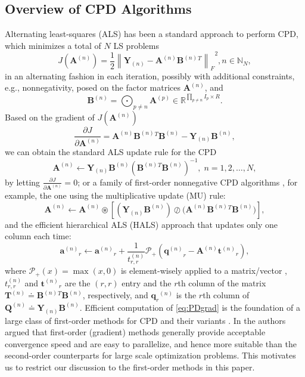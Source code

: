 \documentclass[10pt,twocolumn,twoside]{IEEEtran}
\newcommand{\mats}[2][n]{\ensuremath{\mathbf{#2}_{#1}}}
\newcommand{\tenmat}[2][n]{\ensuremath{{\mathbf{#2}}_{(#1)}}}
\newcommand{\matn}[2][n]{\ensuremath{\mathbf{#2}^{(#1)}}}
\newcommand{\Real}{\ensuremath{\mathbb{R}}}
\newcommand{\Natural}{\ensuremath{\mathbb{N}}}
\newcommand{\fpartial}[2]{\ensuremath{\frac{\partial #1}{\partial #2}}}
\newcommand{\matdiv}[2]{\ensuremath{{#1}\oslash{#2}}}
\newcommand{\defeq}{\ensuremath{\doteq}}
\DeclareMathOperator*{\hdp}{{\circledast}}     \DeclareMathOperator*{\bigkkp}{{\bigotimes}}         \DeclareMathOperator*{\bigkrp}{{\bigodot}}
\newcommand{\frob}[2][F]{\ensuremath{\left\|#2\right\|_{#1}}}
\renewcommand{\from}{\ensuremath{\leftarrow}}
\newcommand{\proj}{\ensuremath{\mathcal{P}}}
\begin{document}
\subsection{Overview of CPD Algorithms}
Alternating least-squares (ALS) has been a standard approach to perform CPD, which minimizes a total of $N$ LS problems 
\begin{equation}
\label{eq:PDLS}
J(\matn{A})=\frac{1}{2}\frob{\tenmat{Y}-\matn{A}\matn{B}{}^T}^2, n\in\Natural_N,
\end{equation}
in an alternating fashion in each iteration, possibly with additional constraints, e.g., nonnegativity, posed on the factor matrices \matn{A}, and 
 \begin{equation}
 \label{eq:PDBn}
 \matn{B}=\bigkrp\nolimits_{p\neq n}\matn[p]{A}\in\Real^{\prod_{p\neq n}I_p\times R}.  
 \end{equation}
Based on the gradient of $J(\matn{A})$
 \begin{equation}
 \label{eq:PDgrad}
 \fpartial{J}{\matn{A}}=\matn{A}\matn{B}{}^T\matn{B}-\tenmat{Y}\matn{B},
 \end{equation}
we can obtain the standard ALS update rule for the CPD
 \begin{equation}
 \label{eq:LS}
 \matn{A}\from\tenmat{Y}\matn{B}{(\matn{B}{}^T\matn{B})}^{-1},\; n=1,2,\ldots,N,
 \end{equation}
by letting $\fpartial{J}{\matn{A}}=0$; or a family of first-order nonnegative CPD algorithms \cite{SPM_NMFNTD}, for example, the one using the multiplicative update (MU) rule:
\begin{equation}
\label{eq:NPDMU}
\matn{A}\from\matn{A}\hdp\left[\matdiv{(\tenmat{Y}\matn{B})}{(\matn{A}\matn{B}{}^T\matn{B}})\right],
\end{equation} 
and the efficient hierarchical ALS (HALS) approach that updates only one column each time:
  \begin{equation}
\label{eq:HALS}
\matn{a}_r \from \matn{a}_r+\frac{1}{t^{(n)}_{r,r}}\proj_+{\left(\matn{q}_r-\matn{A}\matn{t}_r\right)},
\end{equation}
where $\proj_+(x)=\max(x,0)$ is element-wisely applied to a matrix/vector \cite{TSP-lraNMF,SPM_NMFNTD}, $t^{(n)}_{r,r}$ and $\matn{t}_r$ are the $(r,r)$ entry and the $r$th column of the matrix $\matn{T}\defeq\matn{B}{}^T\matn{B}$, respectively, and $\mats[r]{q}^{(n)}$ is the $r$th column of $\matn{Q}\defeq\tenmat{Y}\matn{B}$. Efficient computation of \eqref{eq:PDgrad} is the foundation of a large class of first-order methods for CPD and their variants \cite{SPM_NMFNTD}.   In \cite{spm2014_ConvOpti} the authors argued that first-order (gradient) methods generally provide acceptable convergence speed and are easy to parallelize, and hence more suitable than the second-order counterparts for large scale optimization problems. This motivates us to restrict our discussion to the first-order methods in this paper.
 
\end{document}
